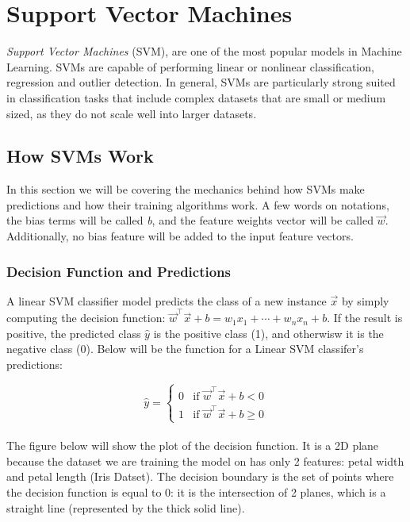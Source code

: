 
\section{Support Vector Machines}

\textit{Support Vector Machines} (SVM), are one of the most popular models in Machine Learning. SVMs are capable of 
performing linear or nonlinear classification, regression and outlier detection. In general, SVMs are particularly 
strong suited in classification tasks that include complex datasets that are small or medium sized, as they do 
not scale well into larger datasets.

\subsection{How SVMs Work}

In this section we will be covering the mechanics behind how SVMs make predictions and how their training algorithms
work. A few words on notations, the bias terms will be called \textit{b}, and the feature weights vector will be 
called $\vec{w}$. Additionally, no bias feature will be added to the input feature vectors.

\subsubsection*{Decision Function and Predictions}

A linear SVM classifier model predicts the class of a new instance $\vec{x}$ by simply computing the
decision function: $\vec{w}^{\intercal}\vec{x} + b = w_{1}x_{1} + \cdots + w_{n}x_{n} + b$. If the result is 
positive, the predicted class $\hat{y}$ is the positive class (1), and otherwisw it is the negative class (0).
Below will be the function for a Linear SVM classifer's predictions:

\[ \hat{y} = 
\begin{cases} 
    0 & \text{if } \vec{w}^{\intercal}\vec{x} + b < 0 \\
    1 & \text{if } \vec{w}^{\intercal}\vec{x} + b \geq 0
\end{cases}
\] \\

\noindent
The figure below will show the plot of the decision function. It is a 2D plane because the dataset we are 
training the model on has only 2 features: petal width and petal length (Iris Datset). The decision boundary
is the set of points where the decision function is equal to 0: it is the intersection of 2 planes, which 
is a straight line (represented by the thick solid line).

